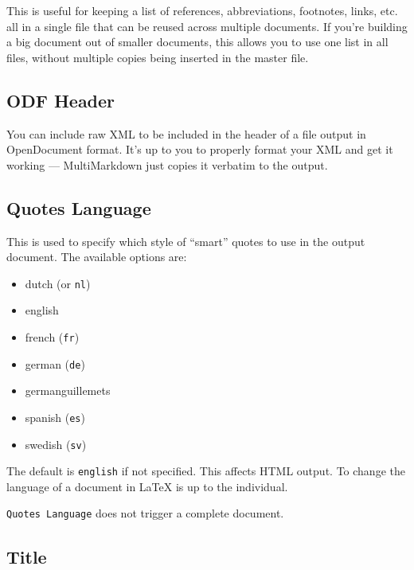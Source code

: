 This is useful for keeping a list of references, abbreviations, footnotes, links, etc. all in a single file that can be reused across multiple documents. If you're building a big document out of smaller documents, this allows you to use one list in all files, without multiple copies being inserted in the master file.

\subsection{ODF Header }
\label{odfheader}

You can include raw XML to be included in the header of a file output in
OpenDocument format. It's up to you to properly format your XML and get it
working --- MultiMarkdown just copies it verbatim to the output.

\subsection{Quotes Language }
\label{quoteslanguage}

This is used to specify which style of ``smart'' quotes to use in the output document. The available options are:

\begin{itemize}
\item dutch (or \texttt{nl})

\item english

\item french (\texttt{fr})

\item german (\texttt{de})

\item germanguillemets

\item spanish (\texttt{es})

\item swedish (\texttt{sv})

\end{itemize}

The default is \texttt{english} if not specified. This affects HTML output. To
change the language of a document in LaTeX is up to the individual.

\texttt{Quotes Language} does not trigger a complete document.

\subsection{Title }
\label{title}

